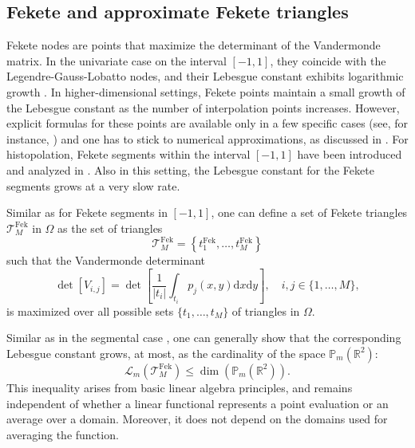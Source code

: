 \documentclass{svjour3}
\newcommand{\de}{\mathrm{d}}
\renewcommand{\P}{\mathbb{P}} %
\renewcommand{\de}{\mathrm{d}} %
\begin{document}
\subsection{Fekete and approximate Fekete triangles}
Fekete nodes are points that maximize the determinant of the Vandermonde matrix. In the univariate case on the interval $[-1,1]$, they coincide with the Legendre-Gauss-Lobatto nodes, and their Lebesgue constant exhibits logarithmic growth \cite{IbrahimogluSurvey}. In higher-dimensional settings, Fekete points maintain a small growth of the Lebesgue constant as the number of interpolation points increases. However, explicit formulas for these points are available only in a few specific cases (see, for instance, \cite{Bos2023}) and one has to stick to numerical approximations, as discussed in \cite{BSV12}. For histopolation, Fekete segments within the interval $[-1,1]$ have been introduced and analyzed in \cite{BruniErbFekete}. Also in this setting, the Lebesgue constant for the Fekete segments grows at a very slow rate. 

Similar as for Fekete segments in $[-1,1]$, one can define a set of Fekete triangles $ \mathcal{T}_M^{\mathrm{Fek}} $ in $\Omega$ as the set of triangles $$\mathcal{T}_M^{\mathrm{Fek}} =\left\{ t_1^{\mathrm{Fek}}, \ldots, t_M^{\mathrm{Fek}} \right\}$$ 
such that the Vandermonde determinant
\begin{equation} \label{eq:FeketeDet}
	\det \left[ V_{i,j} \right] = \det \left[ \frac{1}{|t_i|} \int_{t_i} p_j(x,y) \de x \de y \right], \quad i,j \in \{1, \ldots, M\}, 
	\end{equation}
is maximized over all possible sets $\{t_1, \ldots, t_M\}$ of triangles in $\Omega$.

Similar as in the segmental case \cite{BruniErbFekete}, one can generally show that the corresponding Lebesgue constant grows, at most, as the cardinality of the space $ \P_m\left(\mathbb{R}^2\right)  $:
\begin{equation} \label{eq:LebFek}
	\mathscr{L}_{m} \left(\mathcal{T}_M^{\mathrm{Fek}}\right) \leq \dim\left( \P_m \left(\mathbb{R}^2\right)\right) .
\end{equation}
This inequality arises from basic linear algebra principles, and remains independent of whether a linear functional represents a point evaluation or an average over a domain. Moreover, it does not depend on the domains used for averaging the function. 
\end{document}
